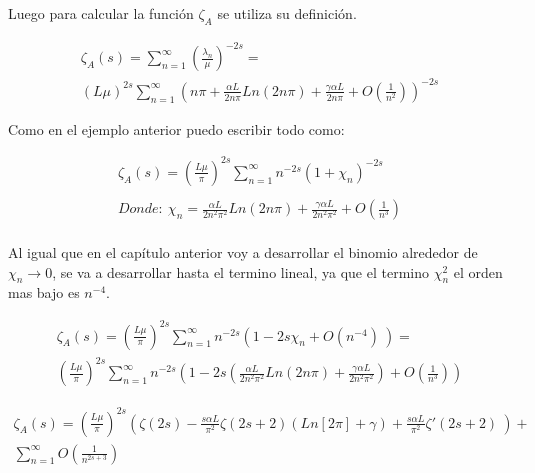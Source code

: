 Luego para calcular la función $\zeta _{A}$ se utiliza su definición.

\begin{equation}
\begin{array}{c}
    \zeta _A (s) = \sum _{n=1} ^{\infty} \left( \frac{\lambda _n}{\mu} \right) ^{-2 s}  = \\
    ( L \mu ) ^{2 s} \sum _{n=1} ^{\infty} 
    \left( 
    n \pi + \frac{\alpha L }{2 n \pi} Ln(2 n \pi) + \frac{\gamma \alpha L}{2 n \pi} +
    O(\frac{1}{n^2})
    \right) ^{-2s}
    
\end{array}
\end{equation}

Como en el ejemplo anterior puedo escribir todo como:

\begin{equation}
\begin{array}{c}
    \zeta _A (s) = \left( \frac{L \mu }{\pi} \right)  ^{2 s} 
    \sum _{n=1} ^{\infty} n ^{- 2  s} 
    \left(
    	1 + \chi _n 
    	\right) ^{-2 s} \\ \\
    	Donde: \ \chi _n = 
    	\frac{\alpha L  }{2 n^2 \pi ^2} Ln(2 n \pi) + 
    	\frac{\gamma \alpha L}{2 n^2 \pi ^2 } +
    	O \left(
    		\frac{1}{n^3} \right)    	\\	
    		 
\end{array}
\end{equation}

Al igual que en el capítulo anterior voy a desarrollar el binomio alrededor de  $\chi _n \rightarrow 0$, se va a desarrollar hasta el termino lineal, ya que el termino $\chi _n ^2 $ el orden mas bajo es $n ^{-4} $. 


\begin{equation}
\begin{array}{c}
    \zeta _A (s) = ( \frac{L \mu}{\pi} ) ^{2 s}
    \sum _{n=1} ^{\infty} 
    n ^{-2s}
    \left(
    1 - 2 s \chi _n + O(n ^{-4}) \
    \right) =  \\
    ( \frac{L \mu }{\pi} ) ^{2 s}
    \sum _{n=1} ^{\infty} n ^{-2 s} 
    \left(
    1 - 2s \left(
    \frac{\alpha L }{2 n ^2 \pi ^2} Ln( 2  n \pi) + 
    \frac{\gamma \alpha L }{2 n ^2 \pi ^2} 
	\right) +
    O (\frac{1}{n ^{3} }  )
    \right)
\end{array}
\end{equation}


\begin{equation}
\begin{array}{c}
    \zeta _A (s) = 
    \left( \frac{L \mu }{ \pi } \right) ^{2 s}  
    \left(
    \zeta (2 s) -
	\frac{ s \alpha L}{ \pi ^2} \zeta (2s+2)
	\left(
	   Ln[2  \pi ] + \gamma
	\right) +
    \frac{s \alpha L}{\pi ^2}
	\zeta '(2s+2) \
	\right) + \\
    \sum _{n=1} ^{\infty} O \left( \frac{1}{n ^{2s+3}} \right)
\end{array}
\end{equation}

